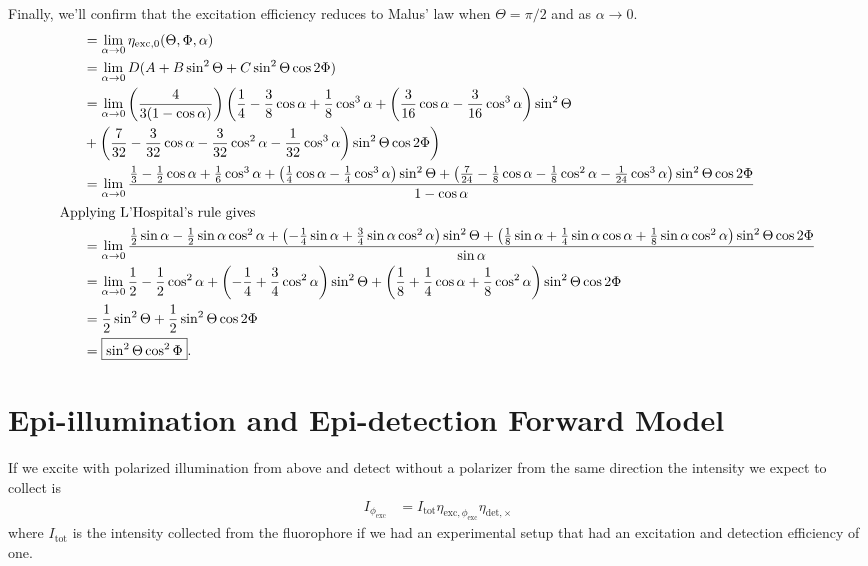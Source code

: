 \documentclass[11pt]{article}
\begin{document}
Finally, we'll confirm that the excitation efficiency reduces to Malus' law when $\Theta = \pi/2$ and as $\alpha \rightarrow 0$.
\begin{align*}
  &=\lim_{\alpha\rightarrow 0} \eta_{\text{exc},0}(\Theta, \Phi, \alpha)\\
  &= \lim_{\alpha\rightarrow 0}D(A + B\sin^2\Theta + C\sin^2\Theta\cos{2 \Phi})\\
  &= \lim_{\alpha\rightarrow 0} \left(\frac{4}{3(1-\cos\alpha)}\right)\bigg(\frac{1}{4} - \frac{3}{8} \cos{\alpha } + \frac{1}{8} \cos^{3}{\alpha } + \left(\frac{3}{16}\cos\alpha - \frac{3}{16}\cos^3\alpha\right)\sin^2\Theta\\ \ \ \ \ \ &+ \left(\frac{7}{32} - \frac{3}{32} \cos{\alpha } - \frac{3}{32} \cos^{2}{\alpha } - \frac{1}{32} \cos^{3}{\alpha}\right)\sin^2\Theta\cos 2\Phi\bigg)\\
  &= \lim_{\alpha\rightarrow 0} \frac{\frac{1}{3} - \frac{1}{2} \cos{\alpha } + \frac{1}{6} \cos^{3}{\alpha } + \left(\frac{1}{4}\cos\alpha - \frac{1}{4}\cos^3\alpha\right)\sin^2\Theta + \left(\frac{7}{24} - \frac{1}{8} \cos{\alpha } - \frac{1}{8} \cos^{2}{\alpha } - \frac{1}{24} \cos^{3}{\alpha}\right)\sin^2\Theta\cos 2\Phi}{1 - \cos\alpha}\\
  \intertext{Applying L'Hospital's rule gives}
  &= \lim_{\alpha\rightarrow 0} \frac{\frac{1}{2} \sin{\alpha } - \frac{1}{2}\sin\alpha\cos^{2}{\alpha } + \left(-\frac{1}{4}\sin\alpha + \frac{3}{4}\sin\alpha\cos^2\alpha\right)\sin^2\Theta + \left(\frac{1}{8} \sin{\alpha } + \frac{1}{4}\sin \alpha \cos{\alpha } + \frac{1}{8} \sin\alpha\cos^{2}{\alpha}\right)\sin^2\Theta\cos 2\Phi}{\sin\alpha}\\
    &= \lim_{\alpha\rightarrow 0} \frac{1}{2} - \frac{1}{2}\cos^{2}{\alpha } + \left(-\frac{1}{4} + \frac{3}{4}\cos^2\alpha\right)\sin^2\Theta + \left(\frac{1}{8} + \frac{1}{4}\cos{\alpha } + \frac{1}{8}\cos^{2}{\alpha}\right)\sin^2\Theta\cos 2\Phi\\
  &= \frac{1}{2}\sin^2\Theta + \frac{1}{2}\sin^2\Theta\cos 2\Phi\\
  &= \boxed{\sin^2\Theta\cos^2{\Phi}}.
\end{align*}

\section{Epi-illumination and Epi-detection Forward Model}
If we excite with polarized illumination from above and detect without a
polarizer from the same direction the intensity we expect to collect is
\begin{align}
  I_{\phi_{\text{exc}}} &= I_{\text{tot}}\eta_{\text{exc},\phi_{\text{exc}}}\eta_{\text{det}, \times}
\end{align}
where $I_{\text{tot}}$ is the intensity collected from the fluorophore if we had
an experimental setup that had an excitation and detection efficiency of one.
\end{document}
